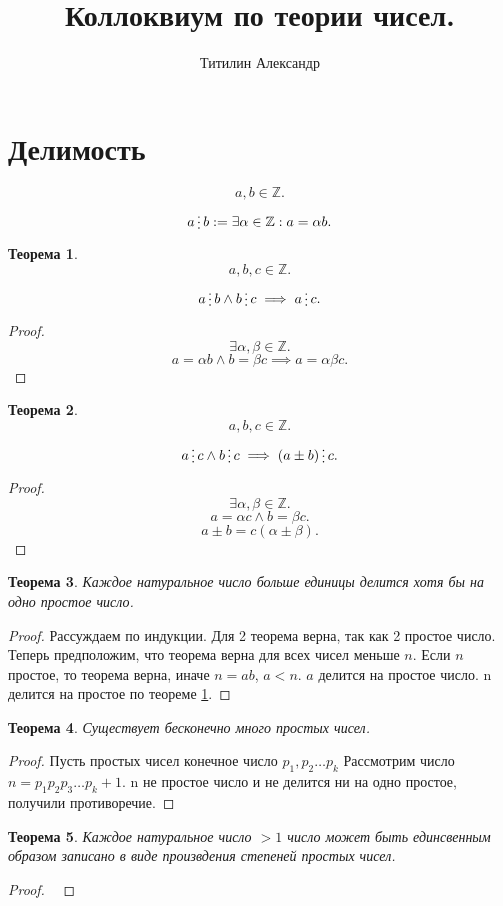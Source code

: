\documentclass{scrarticle}
\title{Коллоквиум по теории чисел.}
\author{Титилин Александр}
\date{}
\newtheorem{theorem}{Теорема}
\newcommand{\divisible}{\mathop{\raisebox{-2pt}{\vdots}}}
\begin{document}
    \maketitle
    \section{Делимость}
    \[
    a , b \in \mathbb{Z}
    .\] 
    \[
    a \divisible b := \exists \alpha \in \mathbb{Z} : a = \alpha b
    .\] 
    \begin{theorem} \label{1}
        \[
        a,b,c\in \mathbb{Z}
        .\] 
        \[
        a \divisible b \land b \divisible c \implies a \divisible c
        .\] 
    \end{theorem}
    \begin{proof}
        \[
        \exists \alpha , \beta \in \mathbb{Z}
        .\] 
        \[
        a = \alpha b \land b = \beta c \implies a = \alpha \beta c
        .\] 
    \end{proof}
    \begin{theorem} \label{2}
        \[
        a,b,c \in \mathbb{Z}
        .\] 
        \[
        a \divisible c \land b \divisible c \implies
        (a \pm b) \divisible c
        .\] 
    \end{theorem}
    \begin{proof}
        \[
        \exists \alpha , \beta \in \mathbb{Z}
        .\] 
        \[
        a = \alpha c \land b = \beta c
        .\] 
        \[
        a \pm b = c(\alpha \pm \beta)
        .\] 
    \end{proof}
    \begin{theorem} \label{3}
        Каждое натуральное число больше единицы делится хотя бы на одно простое число.
    \end{theorem}
    \begin{proof}
        Рассуждаем по индукции. Для 2 теорема верна, так как 2 простое число. Теперь предположим, что теорема верна для всех чисел меньше $n$. Если  $n$ простое, то теорема верна, иначе $n = ab$,  $a < n$.  $a$ делится на простое число. n делится на простое по теореме \ref{1}.
    \end{proof}
    \begin{theorem}
        Существует бесконечно много простых чисел.
    \end{theorem}
    \begin{proof}
        Пусть простых чисел конечное число $p_1,p_2\dots p_k$ 
        Рассмотрим число $n = p_1 p_2 p_3 \dots p_k + 1$. n не простое число и не делится ни на одно простое, получили противоречие.
    \end{proof}
    \begin{theorem}
        Каждое натуральное число $> 1$ число может быть единсвенным образом записано в виде произвдения степеней простых чисел.
    \end{theorem}
    \begin{proof}
        \
    \end{proof}
\end{document}
